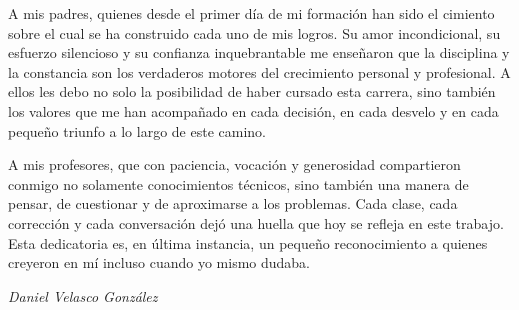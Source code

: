 {\hfill
    \begin{minipage}{0.7\textwidth}
        \noindent
        A mis padres, quienes desde el primer d\'ia de mi formaci\'on han sido el cimiento sobre el cual se ha construido cada uno de mis logros. Su amor incondicional, su esfuerzo silencioso y su confianza inquebrantable me ense\~naron que la disciplina y la constancia son los verdaderos motores del crecimiento personal y profesional. A ellos les debo no solo la posibilidad de haber cursado esta carrera, sino tambi\'en los valores que me han acompa\~nado en cada decisi\'on, en cada desvelo y en cada peque\~no triunfo a lo largo de este camino.\\
        \vspace*{0.2cm}

        \noindent
        A mis profesores, que con paciencia, vocaci\'on y generosidad compartieron conmigo no solamente conocimientos t\'ecnicos, sino tambi\'en una manera de pensar, de cuestionar y de aproximarse a los problemas. Cada clase, cada correcci\'on y cada conversaci\'on dej\'o una huella que hoy se refleja en este trabajo. Esta dedicatoria es, en \'ultima instancia, un peque\~no reconocimiento a quienes creyeron en m\'i incluso cuando yo mismo dudaba.\\
        \vspace*{0.3cm}

        \hfill\textit{Daniel Velasco Gonz\'alez}\\
    \end{minipage}
}
\newpage
